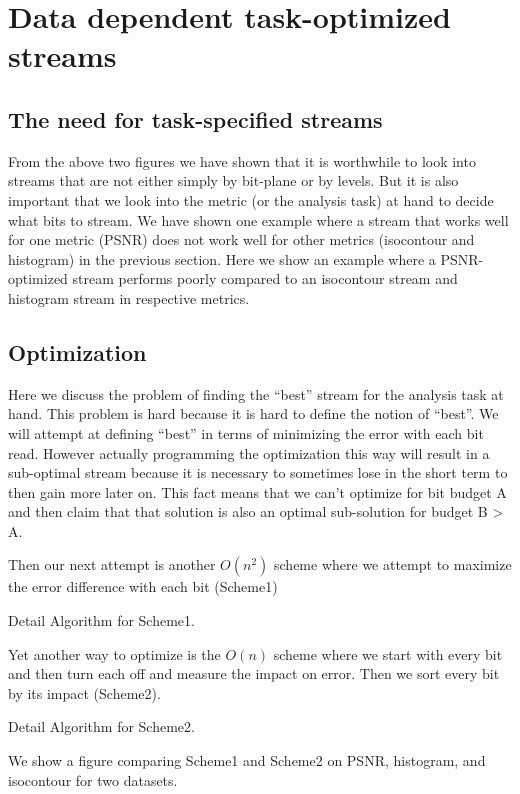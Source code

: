 \section{Data dependent task-optimized streams}

\subsection{The need for task-specified streams}
From the above two figures we have shown that it is worthwhile to look into streams that are not either simply by bit-plane or by levels. But it is also important that we look into the metric (or the analysis task) at hand to decide what bits to stream. We have shown one example where a stream that works well for one metric (PSNR) does not work well for other metrics (isocontour and histogram) in the previous section. Here we show an example where a PSNR-optimized stream performs poorly compared to an isocontour stream and histogram stream in respective metrics.

\subsection{Optimization}
Here we discuss the problem of finding the ``best'' stream for the analysis task at hand. This problem is hard because it is hard to define the notion of ``best''. We will attempt at defining ``best'' in terms of minimizing the error with each bit read. However actually programming the optimization this way will result in a sub-optimal stream because it is necessary to sometimes lose in the short term to then gain more later on. This fact means that we can't optimize for bit budget A and then claim that that solution is also an optimal sub-solution for budget B > A.

Then our next attempt is another $O(n^2)$ scheme where we attempt to maximize the error difference with each bit (Scheme1)

Detail Algorithm for Scheme1.

Yet another way to optimize is the $O(n)$ scheme where we start with every bit and then turn each off and measure the impact on error. Then we sort every bit by its impact (Scheme2).

Detail Algorithm for Scheme2.

We show a figure comparing Scheme1 and Scheme2 on PSNR, histogram, and isocontour for two datasets.
